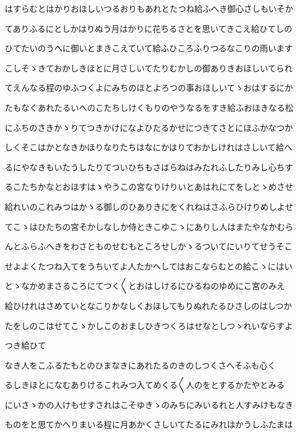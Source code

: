 \documentclass[a4paper,11pt,landscape]{ltjtarticle}
\begin{document}
\par\medskip
はすらむとはかりおほしいつるおりもあれとたつね給ふへき御心さしもいそか
\par\medskip
てありふるにとしかはりぬう月はかりに花ちるさとを思いてきこえ給ひてしの
\par\medskip
ひてたいのうへに御いとまきこえていて給ふひころふりつるなこりの雨います
\par\medskip
こしそゝきておかしきほとに月さしいてたりむかしの御ありきおほしいてられ
\par\medskip
てえんなる程のゆふつくよにみちのほとよろつの事おほしいてゝおはするにか
\par\medskip
たもなくあれたるいへのこたちしけくもりのやうなるをすき給ふおほきなる松
\par\medskip
にふちのさきかゝりてつきかけになよひたるかせにつきてさとにほふかなつか
\par\medskip
しくそこはかとなきかほりなりたちはなにかはりておかしけれはさしいて給へ
\par\medskip
るにやなきもいたうしたりてついひちもさはらねはみたれふしたりみし心ちす
\par\medskip
るこたちかなとおほすはゝやうこの宮なりけりいとあはれにてをしとゝめさせ
\par\medskip
給れいのこれみつはかゝる御しのひありきにをくれねはさふらひけりめしよせ
\par\medskip
てこゝはひたちの宮そかしなしか侍ときこゆこゝにありし人はまたやなかむら
\par\medskip
んとふらふへきをわさとものせむもところせしかゝるついてにいりてせうそこ
\par\medskip
せよよくたつね入てをうちいてよ人たかへしてはおこならむとの給こゝにはい
\par\medskip
とゝなかめまさるころにてつく〱とおはしけるにひるねのゆめにこ宮のみえ
\par\medskip
給ひけれはさめていとなこりかなしくおほしてもりぬれたるひさしのはしつか
\par\medskip
たをしのこはせてこゝかしこのおましひきつくろはせなとしつゝれいならすよ
\par\medskip
つき給ひて
\par\medskip
なき人をこふるたもとのひまなきにあれたるのきのしつくさへそふも心く
\par\medskip
るしきほとになむありけるこれみつ入てめくる〱人のをとするかたやとみる
\par\medskip
にいさゝかの人けもせすされはこそゆきゝのみちにみいるれと人すみけもなき
\par\medskip
ものをと思てかへりまいる程に月あかくさしいてたるにみれはかうしふたまは
\end{document}
